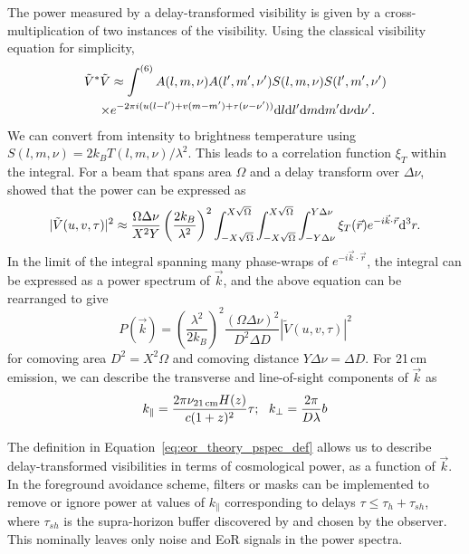 The power measured by a delay-transformed visibility is given by a cross-multiplication of two instances of the visibility. Using the classical visibility equation for simplicity,
\begin{align}
\tilde{V}^*\tilde{V} &\approx \int^{(6)} A(l,m,\nu)A(l',m',\nu') S(l,m,\nu) S(l',m',\nu')\\
					\times	 & e^{-2\pi i (u (l-l') + v (m-m') + \tau (\nu - \nu'))} {\rm d}l {\rm d}l' {\rm d}m {\rm d}m' {\rm d}\nu {\rm d}\nu'.
\end{align}
We can convert from intensity to brightness temperature using $S(l,m,\nu) = 2k_BT(l,m,\nu)/\lambda^2$. 
This leads to a correlation function $\xi_{T}$ within the integral.
For a beam that spans area $\Omega$ and a delay transform over $\Delta\nu$, \cite{Parsons.12a} showed that the power can be expressed as
\begin{equation}
| \tilde{V}(u,v,\tau) |^2 \approx \frac{\Omega\Delta\nu}{X^2 Y} \left(\frac{2k_B}{\lambda^2}\right)^2 \int^{X\sqrt{\Omega}}_{-X\sqrt{\Omega}} \int^{X\sqrt{\Omega}}_{-X\sqrt{\Omega}} \int^{Y\Delta\nu}_{-Y\Delta\nu} \xi_T (\vec{r})e^{-i\vec{k}\cdot\vec{r}}{\rm d}^3 r.
\end{equation}
In the limit of the integral spanning many phase-wraps of $e^{-i\vec{k}\cdot\vec{r}}$, the integral can be expressed as a power spectrum of $\vec{k}$, and the above equation can be rearranged to give
\begin{equation}
P(\vec{k}) = \left(\frac{\lambda^2}{2k_B}\right)^2 \frac{(\Omega \Delta\nu)^2}{D^2 \Delta D} | \tilde{V}(u,v,\tau) |^2
\label{eq:eor_theory_pspec_def}
\end{equation}
for comoving area $D^2 = X^2\Omega$ and comoving distance $Y\Delta\nu = \Delta D$. For 21\,cm emission, we can describe the transverse and line-of-sight components of $\vec{k}$ as
\begin{equation}
k_{\parallel} = \frac{2\pi\nu_{\rm 21\,cm}H(z)}{c(1+z)^2}\tau ;\,\,\,\,k_{\perp} = \frac{2\pi}{D\lambda}b
\end{equation}

The definition in Equation~\ref{eq:eor_theory_pspec_def} allows us to describe delay-transformed visibilities in terms of cosmological power, as a function of $\vec{k}$. In the foreground avoidance scheme, filters or masks can be implemented to remove or ignore power at values of $k_{\parallel}$ corresponding to delays $\tau \leq \tau_h + \tau_{sh}$, where $\tau_{sh}$ is the supra-horizon buffer discovered by \cite{Pober.13} and chosen by the observer. This nominally leaves only noise and EoR signals in the power spectra.

